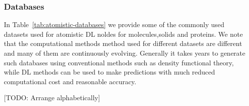 \documentclass[pdflatex,sn-mathphys]{sn-jnl}%
\theoremstyle{thmstyleone}%
\theoremstyle{thmstyletwo}%
\theoremstyle{thmstylethree}%
\begin{document}
\subsubsection{Databases }
In Table~\ref{tab:atomistic-databases} we provide some of the commonly used datasets used for atomistic DL noldes for molecules,solids and proteins. We note that the computational methods method used for different datasets are different and many of them are continuously evolving. Generally it takes years to generate such databases using conventional methods such as density functional theory, while DL methods can be used to make predictions with much reduced computational cost and reasonable accuracy.

[TODO: Arrange alphabetically]

\begin{table}[h]


\end{table}
\end{document}
